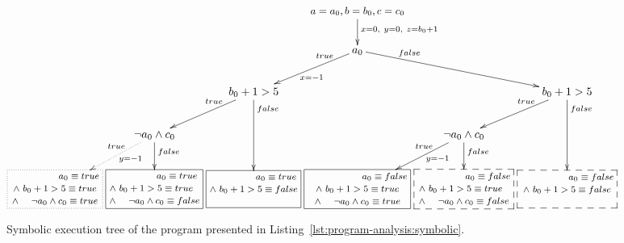 \begin{figure}[t]
\[\xymatrix@C=0.3em{
	 & & & \ar[d]^{x = 0,~y = 0,~z = b_{0} + 1} \txt{\small $a = a_{0},b = b_{0}, c = c_{0}$} \\
	 & & & \ar@{}[ld]_<(0.2){true} \ar[ld]^{x=-1} a_{0} \ar[rrd] \ar@{}[rrd]^<(0.2){false} \\
	 & & \ar@{}[ld]_<(0.2){true} \ar[ld] b_{0} + 1 > 5 \ar[dd] \ar@{}[dd]^<(0.1){false} & & & \ar@{}[ld]_<(0.2){true} \ar[ld] b_{0} + 1 > 5 \ar[dd] \ar@{}[dd]^<(0.1){false} \\ 
	 & \ar@{}[ld]_<(0.2){true} \ar@{.>}[ld]^>(0.5){y=-1} \neg a_{0} \land c_{0} \ar[d] \ar@{}[d]^<(0.2){false} & & & \ar@{}[ld]_<(0.2){true} \ar[ld]^>(0.5){y=-1} \neg a_{0} \land c_{0} \ar[d] \ar@{}[d]^<(0.2){false} & & & \\
	 *+[F.] \txt{\footnotesize $~~~~~~~~~~~~~~~a_{0} \equiv true$ 
	 \\ \footnotesize $\land ~b_{0}+1 > 5 \equiv true$ 
	 \\ \footnotesize $\land ~~~~\neg a_{0} \land c_{0} \equiv true$} & 
	 *+[F] \txt{\footnotesize $~~~~~~~~~~~~~~a_{0} \equiv true$ 
	 \\ \footnotesize $\land ~b_{0}+1 > 5 \equiv true~~$ 
	 \\ \footnotesize $\land ~~~~\neg a_{0} \land c_{0} \equiv false$} & 
	 *+[F] \txt{\footnotesize $~~~~~~~~~~~~~~a_{0} \equiv true$ 
	 \\ \footnotesize $\land ~b_{0}+1 > 5 \equiv false$
	 \\ ~} & 
	 *+[F] \txt{\footnotesize $~~~~~~~~~~~~~~~~~a_{0} \equiv false$ 
	 \\ \footnotesize $\land ~b_{0}+1 > 5 \equiv true$ 
	 \\ \footnotesize $~\land ~~~~\neg a_{0} \land c_{0} \equiv true ~$} &
	 *+[F--] \txt{\footnotesize $~~~~~~~~~~~~~~~a_{0} \equiv false$ 
	 \\ \footnotesize $\land ~b_{0}+1 > 5 \equiv true~~$ 
	 \\ \footnotesize $\land ~~~~\neg a_{0} \land c_{0} \equiv false$} &
	 *+[F--] \txt{\footnotesize $~~~~~~~~~~~~~~~a_{0} \equiv false$ 
	 \\ \footnotesize $\land ~ b_{0}+1 > 5 \equiv false$
 \\ ~}			
} \]
\caption[Symbolic Execution Tree of a Trivial Program]{Symbolic execution tree of the program presented in Listing~\ref{lst:program-analysis:symbolic}.}
\label{fig:program-analysis:symbolic}
\end{figure}


